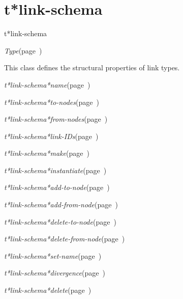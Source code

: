 \section{t*link-schema}
\label{t*link-schema}

\begin{description}
\item [Name:]  t*link-schema

\item [Layer:] {\sl Type}\hfill(page~\pageref{Type})

\item [Description:]

This class defines the structural properties of link
types.

\item [Attributes:]
\item {\sl t*link-schema*name}\hfill(page~\pageref{t*link-schema*name})
\item {\sl t*link-schema*to-nodes}\hfill(page~\pageref{t*link-schema*to-nodes})
\item {\sl t*link-schema*from-nodes}\hfill(page~\pageref{t*link-schema*from-nodes})
\item {\sl t*link-schema*link-IDs}\hfill(page~\pageref{t*link-schema*link-IDs})

\item [Operations:]
\item {\sl t*link-schema*make}\hfill(page~\pageref{t*link-schema*make})
\item {\sl t*link-schema*instantiate}\hfill(page~\pageref{t*link-schema*instantiate})
\item {\sl t*link-schema*add-to-node}\hfill(page~\pageref{t*link-schema*add-to-node})
\item {\sl t*link-schema*add-from-node}\hfill(page~\pageref{t*link-schema*add-from-node})
\item {\sl t*link-schema*delete-to-node}\hfill(page~\pageref{t*link-schema*delete-to-node})
\item {\sl t*link-schema*delete-from-node}\hfill(page~\pageref{t*link-schema*delete-from-node})
\item {\sl t*link-schema*set-name}\hfill(page~\pageref{t*link-schema*set-name})
\item {\sl t*link-schema*divergence}\hfill(page~\pageref{t*link-schema*divergence})
\item {\sl t*link-schema*delete}\hfill(page~\pageref{t*link-schema*delete})


\item [Subclasses:]


\item [Superclasses:]


\item [Instances:]



\end{description}
\horizontalline

